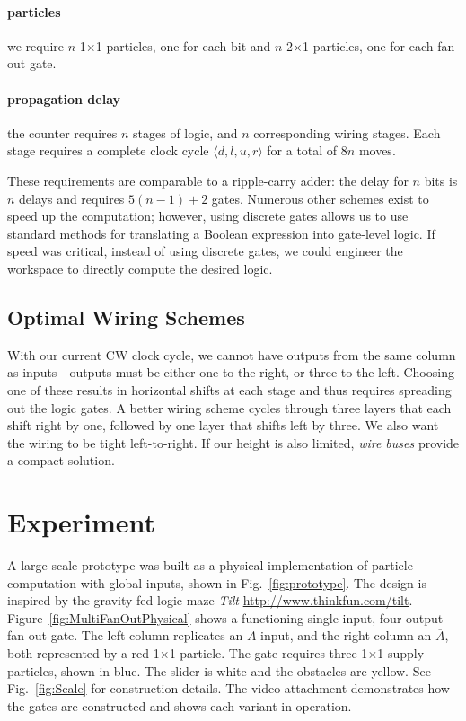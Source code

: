 \documentclass[letterpaper, 10 pt, conference]{ieeeconf}
\begin{document}
\paragraph{particles} we require $n$ 1$\times$1 particles, one for each bit and $n$ 2$\times$1 particles, one for each {\sc fan-out} gate.
\paragraph{ propagation delay} the counter requires $n$ stages of logic, and $n$ corresponding wiring stages.  Each stage requires a complete clock cycle $\langle d,l,u,r \rangle$ for a total of 8$n$ moves.

These requirements are comparable to a ripple-carry adder:  the delay for $n$ bits is $n$ delays  and requires $5(n-1)+2$ gates.
Numerous other schemes exist to speed up the computation; however, using discrete gates allows us to use standard methods for translating a Boolean expression into gate-level logic.  If speed was critical, instead of using discrete gates, we could engineer the workspace to directly compute the desired logic.  

\subsection{Optimal Wiring Schemes}\label{sec:wiring}
With our current CW clock cycle, we cannot have outputs from the same column as
inputs---outputs must be either one to the right, or three to the left.  
Choosing one of these results in horizontal shifts at each stage and thus
requires spreading out the logic gates. A better wiring scheme cycles
through three layers that each shift right by one, followed by one layer that
shifts left by three.  We also want the wiring to be tight left-to-right.  If our
height is also limited, \emph{wire buses} provide a compact solution. 

\section{Experiment}\label{sec:Experiment}
A large-scale prototype was built as a physical implementation of particle computation with global inputs, shown in Fig.~\ref{fig:prototype}.  The design is inspired by the gravity-fed logic maze \emph{Tilt\texttrademark}
\url{http://www.thinkfun.com/tilt}. Figure~\ref{fig:MultiFanOutPhysical} shows a functioning single-input, four-output {\sc fan-out} gate.  The left column replicates an $A$ input, and the right column an $\overline{A}$, both represented by a red 1$\times$1 particle.  The gate requires three  1$\times$1 supply particles, shown in blue.  The slider is white and the obstacles are yellow.  See Fig.~\ref{fig:Scale} for construction details. The video attachment demonstrates how the gates are constructed and shows each variant in operation.
\end{document}
